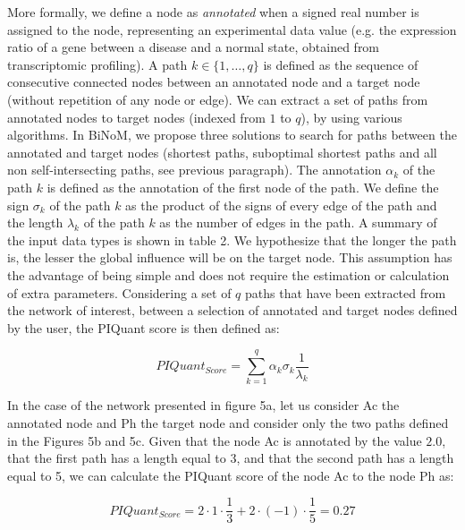 \documentclass[10pt]{bmc_article}
\newenvironment{bmcformat}{\baselineskip20pt\sloppy\setboolean{publ}{false}}{\baselineskip20pt\sloppy}
\begin{document}
\begin{bmcformat}
More formally, we define a node as \textit{annotated} when a signed real
number is assigned to the node, representing an experimental data value (e.g.
the expression ratio of a gene between a disease and a normal state, obtained
from transcriptomic profiling).
 A path $k \in \{1,\ldots , q\}$ is defined
as the sequence of consecutive connected nodes
between an annotated node and a target node (without repetition of any node
or edge). We can extract a set of paths from annotated nodes to target nodes (indexed
from $1$ to $q$), by using various algorithms. In BiNoM, we propose three solutions to search for paths between the
annotated and target nodes (shortest paths, suboptimal shortest paths and all
non self-intersecting paths, see previous paragraph). The annotation
$\alpha_k$ of the path $k$ is defined as the annotation
of the first node of the path. We define the sign $\sigma_k$
of the path $k$ as the product of the signs of every edge of the path and 
the length $\lambda_k$ of the path $k$ as the number of edges in the path. A summary of the input data types is shown in table 2. We
hypothesize that the longer the path is, the lesser the global influence will be
on the target node. This assumption has the advantage of being simple and does
not require the estimation or calculation of extra parameters.
Considering a set of $q$ paths that have been extracted from the network
of interest, between a selection of annotated and target nodes defined by the user, the PIQuant score is then defined as:

$$
 PIQuant_{Score} = \sum_{k=1}^{q} \alpha_{k} \sigma_{k} \frac{1}{\lambda_{k}}
$$

In the case of the network presented in figure 5a, let us
consider Ac the annotated node and Ph the target node and consider only the two
paths defined in the Figures 5b and
5c. Given that the
node Ac is annotated by the value $2.0$, that the first path has a length
equal to 3, and that the second path has a length equal to 5, we can calculate the PIQuant score
of the node Ac to the node Ph as:

$$
 PIQuant_{Score} = 2 \cdot 1 \cdot \frac{1}{3} + 2 \cdot (-1) \cdot \frac{1}{5}
= 0.27
$$



\end{bmcformat}
\end{document}
